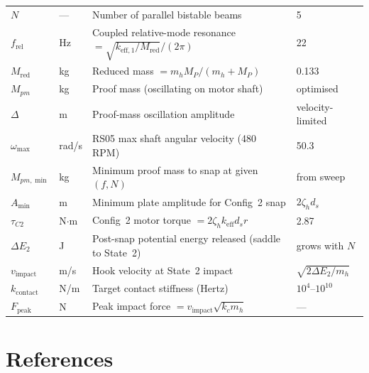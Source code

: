 \documentclass[11pt,letterpaper]{article}
\begin{document}
\begin{longtable}{p{2.1cm} p{1.5cm} p{6.7cm} p{3.1cm}}
$N$        & ---     & Number of parallel bistable beams & 5 \\
$f_{\mathrm{rel}}$ & Hz & Coupled relative-mode resonance $= \sqrt{k_{\mathrm{eff},1}/M_{\mathrm{red}}}/(2\pi)$ & 22 \\
$M_{\mathrm{red}}$ & kg & Reduced mass $= m_h M_P/(m_h+M_P)$ & 0.133 \\
$M_{pm}$   & kg      & Proof mass (oscillating on motor shaft) & optimised \\
$\Delta$   & m       & Proof-mass oscillation amplitude & velocity-limited \\
$\omega_{\max}$ & rad/s & RS05 max shaft angular velocity (480 RPM) & 50.3 \\
$M_{pm,\min}$ & kg   & Minimum proof mass to snap at given $(f,N)$ & from sweep \\
$A_{\min}$ & m       & Minimum plate amplitude for Config~2 snap & $2\zeta_h d_s$ \\
$\tau_{C2}$ & N$\cdot$m & Config~2 motor torque $= 2\zeta_h k_{\mathrm{eff}} d_s r$ & 2.87 \\
$\Delta E_2$ & J     & Post-snap potential energy released (saddle to State~2) & grows with $N$ \\
$v_{\mathrm{impact}}$ & m/s & Hook velocity at State~2 impact & $\sqrt{2\Delta E_2/m_h}$ \\
$k_{\mathrm{contact}}$ & N/m & Target contact stiffness (Hertz) & $10^4$--$10^{10}$ \\
$F_{\mathrm{peak}}$ & N & Peak impact force $= v_{\mathrm{impact}}\sqrt{k_c m_h}$ & --- \\
\end{longtable}
\endgroup

\section*{References}
\end{document}

